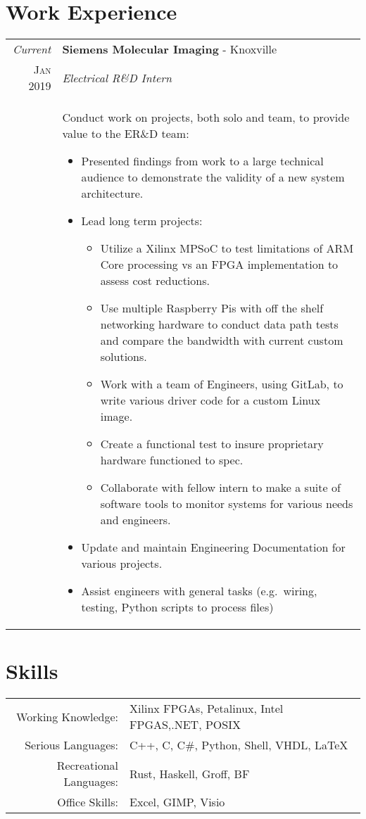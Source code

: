 \documentclass[a4paper,11pt]{article}
\begin{document}
\section{Work Experience}
\begin{tabularx}{\textwidth}{r|X}
   \emph{Current} & \textbf{Siemens Molecular Imaging} \-- Knoxville\\
   \textsc{Jan 2019} & \emph{Electrical R\&D Intern}\\
   & \small{Conduct work on projects, both solo and team, to provide value to the ER\&D team:
      \begin{itemize}[leftmargin=20pt,topsep=1pt,itemsep=0pt,partopsep=1pt, parsep=1pt]
         \item Presented findings from work to a large technical audience to demonstrate the validity of a new system architecture.
         \item Lead long term projects:
            \begin{itemize}[leftmargin=20pt,topsep=1pt,itemsep=0pt,partopsep=1pt, parsep=1pt]
               \item Utilize a Xilinx MPSoC to test limitations of ARM Core processing vs an FPGA implementation to assess cost reductions.
               \item Use multiple Raspberry Pis with off the shelf networking hardware to conduct data path tests and compare the bandwidth with current custom solutions.
               \item Work with a team of Engineers, using GitLab, to write various driver code for a custom Linux image.
               \item Create a functional test to insure proprietary hardware functioned to spec.
               \item Collaborate with fellow intern to make a suite of software tools to monitor systems for various needs and engineers.
            \end{itemize}
         \item Update and maintain Engineering Documentation for various projects.
         \item Assist engineers with general tasks (e.g.\ wiring, testing, Python scripts to process files)
      \end{itemize}}\\
\end{tabularx}

\section{Skills}
\begin{tabularx}{\textwidth}{rl}
   Working Knowledge: & Xilinx FPGAs, Petalinux, Intel FPGAS,.NET, POSIX\\
   Serious Languages:& C++, C, C\#, Python, Shell, VHDL, \LaTeX{}\\
   Recreational Languages:& Rust, Haskell, Groff, BF \\
   Office Skills: & Excel, GIMP, Visio\\
\end{tabularx}
\end{document}
